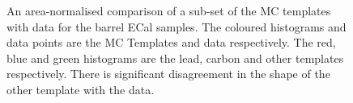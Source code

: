 \begin{figure}%
  \centering
  \caption{An area-normalised comparison of a sub-set of the MC templates with data for the barrel ECal samples.  The coloured histograms and data points are the MC Templates and data respectively.  The red, blue and green histograms are the lead, carbon and other templates respectively.  There is significant disagreement in the shape of the other template with the data.}
  \label{fig:SubsetMCTemplatesT2KDataBarrelModulesAreaNorm}
\end{figure}
